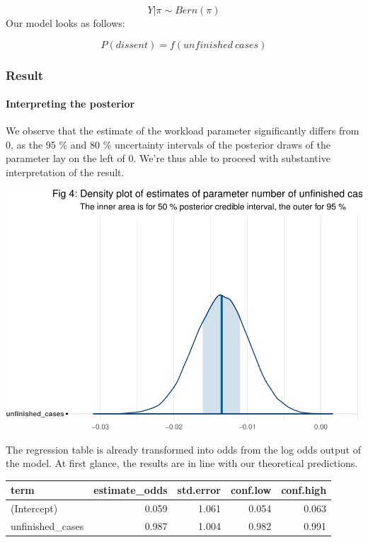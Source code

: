 \documentclass[
  11pt,
]{article}
\begin{document}
\[
Y | \pi \sim Bern(\pi)
\] Our model looks as follows:

\[
P(dissent) = f(unfinished\:cases)
\]

\hypertarget{result}{%
\subsubsection{Result}\label{result}}

\hypertarget{interpreting-the-posterior}{%
\paragraph{Interpreting the
posterior}\label{interpreting-the-posterior}}

We observe that the estimate of the workload parameter significantly
differs from 0, as the 95 \% and 80 \% uncertainty intervals of the
posterior draws of the parameter lay on the left of 0. We're thus able
to proceed with substantive interpretation of the result.

\vspace{10pt}

\includegraphics{dissents_article-anonymised_files/figure-latex/interpreting_posterior2-1.pdf}

The regression table is already transformed into odds from the log odds
output of the model. At first glance, the results are in line with our
theoretical predictions.

\begin{longtable}[]{@{}lrrrr@{}}
\toprule\noalign{}
term & estimate\_odds & std.error & conf.low & conf.high \\
\midrule\noalign{}
\endhead
\bottomrule\noalign{}
\endlastfoot
(Intercept) & 0.059 & 1.061 & 0.054 & 0.063 \\
unfinished\_cases & 0.987 & 1.004 & 0.982 & 0.991 \\
\end{longtable}
\end{document}
